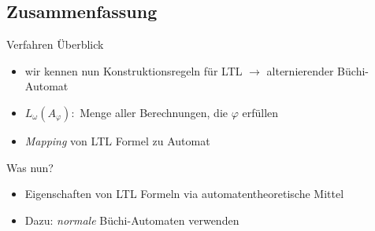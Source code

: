 \subsection{Zusammenfassung}
\begin{frame}{\insertsubsection}
\begin{block}{Verfahren Überblick}
    \begin{itemize}
        \setlength\itemsep{0.7em}
        \item wir kennen nun Konstruktionsregeln für LTL $\rightarrow$ alternierender Büchi-Automat
        \item $L_\omega(A_\varphi):$ Menge aller Berechnungen, die $\varphi$ erfüllen
        \item \textit{Mapping} von LTL Formel zu Automat
    \end{itemize}
\end{block}
\begin{block}{Was nun?}
    \begin{itemize}
        \setlength\itemsep{0.7em}
        \item Eigenschaften von LTL Formeln via automatentheoretische Mittel
        \item Dazu: \textit{normale} Büchi-Automaten verwenden
    \end{itemize}
\end{block}
\end{frame}
